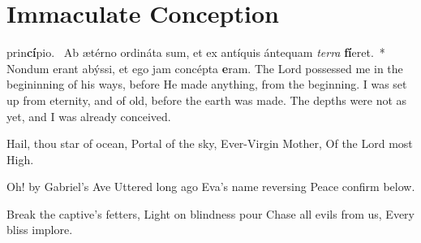 {
\label{immaculateconception}
\def\gabcfolder{../December8-ImmaculateConception}
\section{Immaculate Conception}
\subtitle{1st Class, December 8}

\deusinadjutorium{}

\bigskip
{}
{\def\anttranslation{Thou art all fair, O Mary; and the original stain is not in thee.}
\def\dontrepeatantiphon{T}
}
\bigskip
{}
{\def\anttranslation{Thy vesture is white as snow; and thy face is as the sun.}
}
\bigskip
{}
{\def\anttranslation{Thou art the glory of Jerusalem; thou art the joy of Israel; thou art the honour of our people.}
}
\bigskip
{
\def\anttranslation{Blessed art thou, O Virgin Mary, by the Lord, the Most High God, above all women upon the earth.}
\def\dontrepeatantiphon{T}
\def\noeuouae{T}
}
\bigskip
{
\def\anttranslation{Draw us, O immaculate Virgin: we will run after thee in the odour of thine ointments.}
}
{}
\printchapter
{ prin\-\textbf{cí}\-pi\-o.~\dag{} Ab ætérno ordináta sum, et ex antíquis ántequam \emph{ter\-ra} \textbf{fí}\-e\-ret.~* Nondum erant abýssi, et ego jam concépta \textbf{e}\-ram.}
{The Lord possessed me in the begininning of his ways, before He made anything, from the beginning.  I was set up from eternity, and of old, before the earth was made.  The depths were not as yet, and I was already conceived.}

\bigskip
\label{hymn-avemarisstella}
{
\item Hail, thou star of ocean,
Portal of the sky,
Ever-Virgin Mother,
Of the Lord most High.

\item Oh! by Gabriel's Ave
Uttered long ago
Eva's name reversing
Peace confirm below.

\item Break the captive's fetters,
Light on blindness pour
Chase all evils from us,
Every bliss implore.

}}
